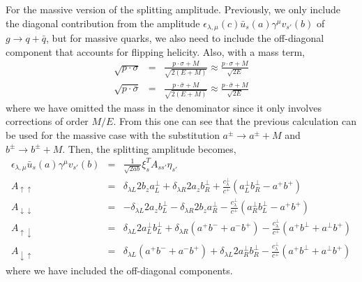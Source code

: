 For the massive version of the splitting amplitude.
Previously, we only include the diagonal contribution from the amplitude $\epsilon_{\lambda, \mu}(c) \bar{u}_s(a) \gamma^\mu v_{s'} (b)$ of $g\rightarrow q+\bar{q}$, but for massive quarks, we also need to include the off-diagonal component that accounts for flipping helicity. 
Also, with a mass term, 
\begin{eqnarray}
\sqrt{p\cdot \sigma} &=& \frac{p\cdot \sigma + M}{\sqrt{2(E+M)}} \approx \frac{p\cdot \sigma + M}{\sqrt{2E}} \\
\sqrt{p\cdot \bar{\sigma}} &=& \frac{p\cdot \bar{\sigma} + M}{\sqrt{2(E+M)}} \approx \frac{p\cdot \bar{\sigma} + M}{\sqrt{2E}}
\end{eqnarray}
where we have omitted the mass in the denominator since it only involves corrections of order $M/E$.
From this one can see that the previous calculation can be used for the massive case with the substitution  $a^\pm \rightarrow a^\pm +M$ and $b^\pm \rightarrow b^\pm +M$.
Then, the splitting amplitude becomes,
\begin{eqnarray}
\epsilon_{\lambda, \mu} \bar{u}_s(a)\gamma^\mu v_{s'}(b)&=& \frac{1}{\sqrt{2ab}}
\xi_s^T A_{ss'} \eta_{s'}\\
A_{\uparrow\uparrow} &=&
\delta_{\lambda L} 2b_z a^\perp_L + \delta_{\lambda R} 2a_z b^\perp_R + \frac{c^\perp_\lambda}{c^+} (a^\perp_L b^\perp_R - a^+ b^+) \\
A_{\downarrow\downarrow} &=&
-\delta_{\lambda L}2a_z b^\perp_L - \delta_{\lambda R}2b_z a^\perp_R - \frac{c^\perp_\lambda}{c^+} (a^\perp_R b^\perp_L - a^+ b^+) \\
A_{\uparrow\downarrow} &=&
\delta_{\lambda L} 2a^\perp_L b^\perp_L + \delta_{\lambda R} (a^+b^-+a^-b^+) - \frac{c^\perp_\lambda}{c^+} (a^+b^\perp + a^\perp b^+) \\
A_{\downarrow\uparrow} &=&
 \delta_{\lambda L} (a^+b^-+a^-b^+) + \delta_{\lambda L} 2a^\perp_R b^\perp_R - \frac{c^\perp_\lambda}{c^+} (a^+b^\perp + a^\perp b^+) 
\end{eqnarray}
where we have included the off-diagonal components.


